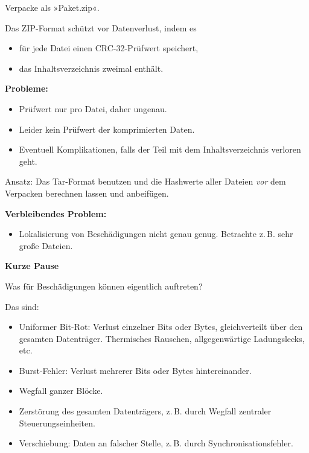 \documentclass[9pt]{beamer}
\newcommand{\strong}[1]{\textsf{\textbf{#1}}}
\begin{document}
\begin{frame}
Verpacke als »Paket.zip«. 

\vspace{1em}
Das ZIP-Format schützt vor Datenverlust, indem es
\begin{itemize}
\item für jede Datei einen CRC-32-Prüfwert speichert,
\item das Inhaltsverzeichnis zweimal enthält.
\end{itemize}\pause

\vspace{1em}
\strong{Probleme:}
\begin{itemize}
\item Prüfwert nur pro Datei, daher ungenau.
\item Leider kein Prüfwert der komprimierten Daten.
\item Eventuell Komplikationen, falls der Teil mit dem
  Inhaltsverzeichnis verloren geht.
\end{itemize}
\end{frame}

\begin{frame}
Ansatz: Das Tar-Format benutzen und die Hashwerte aller Dateien
\emph{vor} dem Verpacken berechnen lassen und anbeifügen.\pause

\vspace{1em}
\strong{Verbleibendes Problem:}
\begin{itemize}
\item Lokalisierung von Beschädigungen nicht genau genug.
Betrachte z.\,B. sehr große Dateien.
\end{itemize}
\end{frame}

\begin{frame}
\begin{center}
\strong{Kurze Pause}
\end{center}
\end{frame}

\begin{frame}
Was für Beschädigungen können eigentlich auftreten?\pause

\vspace{1em}
Das sind:
\begin{itemize}
\item Uniformer Bit-Rot: Verlust einzelner Bits oder Bytes,
  gleichverteilt über den gesamten Datenträger. Thermisches Rauschen,
  allgegenwärtige Ladungslecks, etc.
\item Burst-Fehler: Verlust mehrerer Bits oder Bytes hintereinander.
\item Wegfall ganzer Blöcke.
\item Zerstörung des gesamten Datenträgers, z.\,B. durch Wegfall
  zentraler Steuerungseinheiten.
\item Verschiebung: Daten an falscher Stelle, z.\,B. durch
  Synchronisationsfehler.
\end{itemize}
\end{frame}
\end{document}

